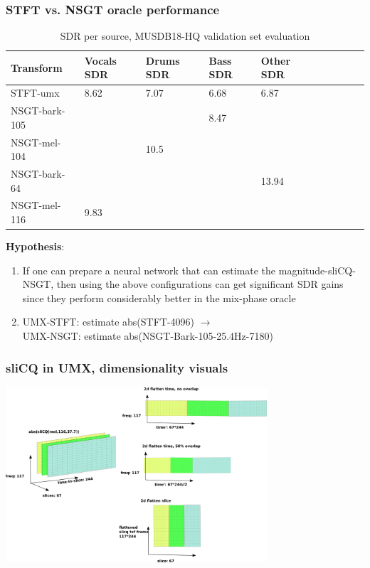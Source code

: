 \documentclass[usenames,dvipsnames]{beamer}
\begin{document}
\begin{frame}
	\frametitle{STFT vs. NSGT oracle performance}
\begin{table}[ht]
	\centering
\begin{tabular}{ |l|l|l|l|l|c|c|c|c|c| }
	 \hline
	  Transform & Vocals SDR & Drums SDR & Bass SDR & Other SDR \\
	 \hline
	 \hline
	 STFT-umx & 8.62 & 7.07 & 6.68 & 6.87 \\
	 \hline
	 NSGT-bark-105 &  & & 8.47 & \\
	 \hline
	 NSGT-mel-104 & & 10.5 & & \\
	 \hline
	 NSGT-bark-64 & & & & 13.94 \\
	 \hline
	 NSGT-mel-116 & 9.83 & & & \\
	 \hline
\end{tabular}
	\caption{SDR per source, MUSDB18-HQ validation set evaluation}
	\vspace{-0.5em}
\end{table}
	\textbf{Hypothesis}:
	\begin{enumerate}
		\item
			If one can prepare a neural network that can estimate the magnitude-sliCQ-NSGT, then using the above configurations can get significant SDR gains since they perform considerably better in the mix-phase oracle
		\item
			UMX-STFT: estimate abs(STFT-4096) $\rightarrow$ \\
			\qquad UMX-NSGT: estimate abs(NSGT-Bark-105-25.4Hz-7180)
	\end{enumerate}
\end{frame}

\begin{frame}
	\frametitle{sliCQ in UMX, dimensionality visuals}
	\includegraphics[height=6.5cm]{./umxslicqdimred.png}
\end{frame}
\end{document}

